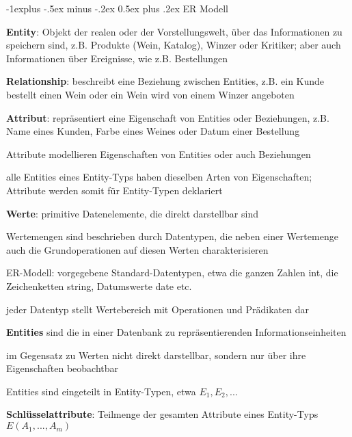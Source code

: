 \documentclass[a4paper]{article}
\makeatletter
\renewcommand{\subsection}{\@startsection{subsection}{2}{0mm}%
                                {-1explus -.5ex minus -.2ex}%
                                {0.5ex plus .2ex}%
                                {\normalfont\normalsize\bfseries}}
\makeatother
\begin{document}
\begin{multicols}{3}
\subsection{ER Modell}
\begin{itemize*}
    \item \textbf{Entity}: Objekt der realen oder der Vorstellungswelt, über das Informationen zu speichern sind, z.B. Produkte (Wein, Katalog), Winzer oder Kritiker; aber auch Informationen über Ereignisse, wie z.B. Bestellungen
    \item \textbf{Relationship}: beschreibt eine Beziehung zwischen Entities, z.B. ein Kunde bestellt einen Wein oder ein Wein wird von einem Winzer angeboten
    \item \textbf{Attribut}: repräsentiert eine Eigenschaft von Entities oder Beziehungen, z.B. Name eines Kunden, Farbe eines Weines oder Datum einer Bestellung
    \begin{itemize*}
        \item Attribute modellieren Eigenschaften von Entities oder auch Beziehungen
        \item alle Entities eines Entity-Typs haben dieselben Arten von Eigenschaften; Attribute werden somit für Entity-Typen deklariert
    \end{itemize*}
    \item \textbf{Werte}: primitive Datenelemente, die direkt darstellbar sind
    \begin{itemize*}
        \item Wertemengen sind beschrieben durch Datentypen, die neben einer Wertemenge auch die Grundoperationen auf diesen Werten charakterisieren
        \item ER-Modell: vorgegebene Standard-Datentypen, etwa die ganzen Zahlen int, die Zeichenketten string, Datumswerte date etc.
        \item jeder Datentyp stellt Wertebereich mit Operationen und Prädikaten dar
    \end{itemize*}
    \item \textbf{Entities} sind die in einer Datenbank zu repräsentierenden Informationseinheiten
    \begin{itemize*}
        \item im Gegensatz zu Werten nicht direkt darstellbar, sondern nur über ihre Eigenschaften beobachtbar
        \item Entities sind eingeteilt in Entity-Typen, etwa $E_1 , E_2,...$
    \end{itemize*}
    \item \textbf{Schlüsselattribute}: Teilmenge der gesamten Attribute eines Entity-Typs $E(A_1,... , A_m)$

\end{itemize*}
\end{multicols}
\end{document}
